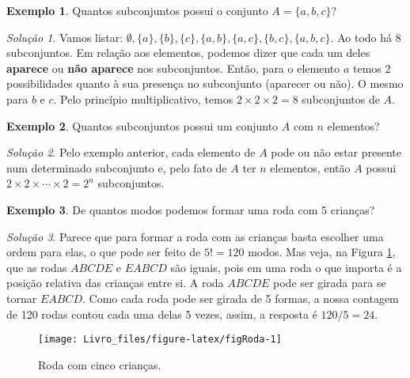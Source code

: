 \documentclass[]{book}
\theoremstyle{definition}
\theoremstyle{definition}
\newtheorem{example}{Exemplo}[chapter]
\theoremstyle{definition}
\theoremstyle{remark}
\newtheorem*{solution}{Solução}
\begin{document}
\begin{example}
\protect\hypertarget{exm:unnamed-chunk-52}{}{\label{exm:unnamed-chunk-52} }Quantos subconjuntos possui o conjunto \(A = \{a,b,c\}\)?
\end{example}

\begin{solution}
\iffalse{} {Solução. } \fi{}Vamos listar: \(\emptyset, \{a\}, \{b\}, \{c\}, \{a,b\}, \{a,c\}, \{b,c\}, \{a,b,c\}\).
Ao todo há 8 subconjuntos.
Em relação aos elementos, podemos dizer que cada um deles \textbf{aparece} ou \textbf{não aparece} nos subconjuntos.
Então, para o elemento \(a\) temos 2 possibilidades quanto à sua presença no subconjunto (aparecer ou não).
O mesmo para \(b\) e \(c\).
Pelo princípio multiplicativo, temos \(2 \times 2 \times 2 = 8\) subconjuntos de \(A\).
\end{solution}

\begin{example}
\protect\hypertarget{exm:unnamed-chunk-54}{}{\label{exm:unnamed-chunk-54} }Quantos subconjuntos possui um conjunto \(A\) com \(n\) elementos?
\end{example}

\begin{solution}
\iffalse{} {Solução. } \fi{}Pelo exemplo anterior, cada elemento de \(A\) pode ou não estar presente num determinado subconjunto e, pelo fato de \(A\) ter \(n\) elementos, então \(A\) possui \(2\times 2 \times \cdots \times 2 = 2^{n}\) subconjuntos.
\end{solution}

\begin{example}
\protect\hypertarget{exm:unnamed-chunk-56}{}{\label{exm:unnamed-chunk-56} }De quantos modos podemos formar uma roda com 5 crianças?
\end{example}

\begin{solution}
\iffalse{} {Solução. } \fi{}Parece que para formar a roda com as crianças basta escolher uma ordem para elas, o que pode ser feito de \(5!=120\) modos.
Mas veja, na Figura \ref{fig:figRoda}, que as rodas \(ABCDE\) e \(EABCD\) são iguais, pois em uma roda o que importa é a posição relativa das crianças entre si.
A roda \(ABCDE\) pode ser girada para se tornar \(EABCD\).
Como cada roda pode ser girada de 5 formas, a nossa contagem de 120 rodas contou cada uma delas 5 vezes, assim, a resposta é \(120/5=24\).
\end{solution}

\begin{figure}

{\centering \texttt{[image: Livro\_files/figure-latex/figRoda-1]} 

}

\caption{Roda com cinco crianças.}\label{fig:figRoda}
\end{figure}
\end{document}
